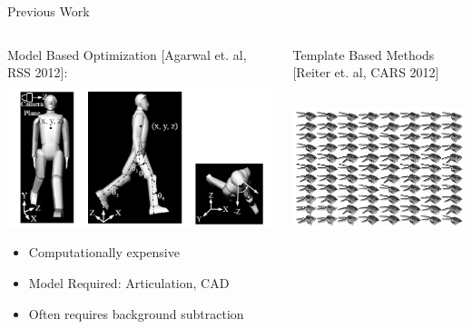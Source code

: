 \begin{frame}{Previous Work }
  \begin{columns}
    \begin{column}{0.5\textwidth}
Model Based Optimization [Agarwal et. al, RSS 2012]:
      \centering
      \includegraphics[width=1\textwidth]{figures/person_model}
\begin{itemize}
\item Computationally expensive
\item Model Required: Articulation, CAD
\item Often requires background subtraction
\end{itemize}
    \end{column}
\begin{column}{0.5\textwidth}
Template Based Methods  [Reiter et. al, CARS 2012]
  \begin{columns}
    \begin{column}{0.3\textwidth}
      \centering
      \includegraphics[width=1\textwidth]{figures/tool_model}

\end{column}
\end{columns}
\end{column}
\end{columns}
\end{frame}
